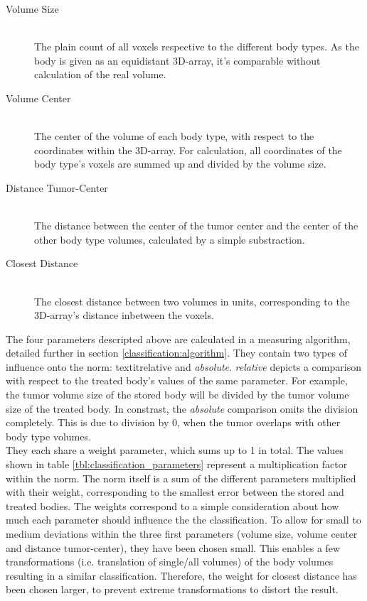 \begin{description}
\item[Volume Size]~\\
The plain count of all voxels respective to the different body types. As the body is given as an equidistant 3D-array, it's comparable without calculation of the real volume.
\item[Volume Center]~\\ The center of the volume of each body type, with respect to the coordinates within the 3D-array. For calculation, all coordinates of the body type's voxels are summed up and divided by the volume size.
\item[Distance Tumor-Center]~\\ The distance between the center of the tumor center and the center of the other body type volumes, calculated by a simple substraction.
\item[Closest Distance]~\\ The closest distance between two volumes in units, corresponding to the 3D-array's distance inbetween the voxels.
\end{description}

The four parameters descripted above are calculated in a measuring algorithm, detailed further in section \ref{classification:algorithm}. They contain two types of influence onto the norm: textit{relative} and \textit{absolute}. \textit{relative} depicts a comparison with respect to the treated body's values of the same parameter. For example, the tumor volume size of the stored body will be divided by the tumor volume size of the treated body. In constrast, the \textit{absolute} comparison omits the division completely. This is due to division by 0, when the tumor overlaps with other body type volumes. \\

They each share a weight parameter, which sums up to 1 in total. The values shown in table \ref{tbl:classification_parameters} represent a multiplication factor within the norm. The norm itself is a sum of the different parameters multiplied with their weight, corresponding to the smallest error between the stored and treated bodies. The weights correspond to a simple consideration about how much each parameter should influence the the classification. To allow for small to medium deviations within the three first parameters (volume size, volume center and distance tumor-center), they have been chosen small. This enables a few transformations (i.e. translation of single/all volumes) of the body volumes resulting in a similar classification. Therefore, the weight for closest distance has been chosen larger, to prevent extreme transformations to distort the result. \\

